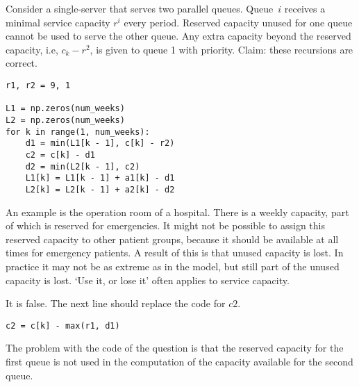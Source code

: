 \documentclass[stochastic-or.tex]{subfiles}
\begin{document}
\begin{truefalse}\label{ex:l-118}
 Consider a single-server that serves two parallel queues.
 Queue~$i$ receives a minimal service capacity $r^i$ every period.
 Reserved capacity unused for one queue cannot be used to serve the other queue.
 Any extra capacity beyond the reserved capacity, i.e, $c_k - r^2$,  is given to queue 1 with priority.
 Claim: these  recursions are correct.
\begin{verbatim}
r1, r2 = 9, 1

L1 = np.zeros(num_weeks)
L2 = np.zeros(num_weeks)
for k in range(1, num_weeks):
    d1 = min(L1[k - 1], c[k] - r2)
    c2 = c[k] - d1
    d2 = min(L2[k - 1], c2)
    L1[k] = L1[k - 1] + a1[k] - d1
    L2[k] = L2[k - 1] + a2[k] - d2
\end{verbatim}
 An example is the operation room of a hospital.
There is a weekly capacity, part of which is reserved for emergencies.
It might not be possible to assign this reserved capacity to other patient groups, because it should be available at all times for emergency patients.
A result of this is that unused capacity is lost.
In practice it may not be as extreme as in the model, but still part of the unused capacity is lost.
`Use it, or lose it' often applies to service capacity.
\begin{solution}
It is false. The next line should replace the code for $c2$.
\begin{verbatim}
c2 = c[k] - max(r1, d1)
\end{verbatim}
The problem with the code of the question is that the reserved capacity for the first queue is not used in the computation of the capacity available for the second queue.
\end{solution}
\end{truefalse}



\end{document}
